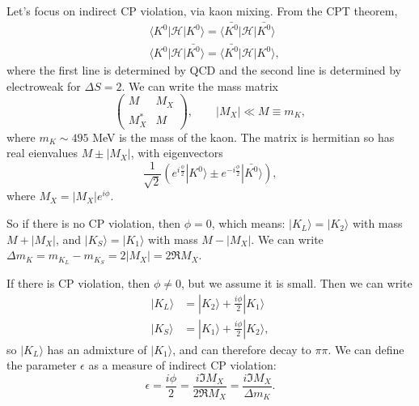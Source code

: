 Let's focus on indirect CP violation, via kaon mixing. From the CPT theorem,
\begin{equation}
\begin{split}
&\langle K^0 | \mathcal{H} | K^0 \rangle = \langle \bar{K^0} | \mathcal{H} | \bar{K^0} \rangle \\
&\langle K^0 | \mathcal{H} | \bar{K^0} \rangle = \langle \bar{K^0} | \mathcal{H} | K^0 \rangle,
\end{split}
\end{equation}
where the first line is determined by QCD and the second line is determined by electroweak for $\Delta S = 2$. We can write the mass matrix
\begin{equation}
\begin{pmatrix}
M & M_X \\
M_X^* & M 
\end{pmatrix},
\qquad |M_X| \ll M \equiv m_K,
\end{equation}
where $m_K \sim 495$ MeV is the mass of the kaon. The matrix is hermitian so has real eienvalues $M \pm |M_X|$, with eigenvectors
\begin{equation}
\frac{1}{\sqrt{2}} (e^{i\frac{\phi}{2}}|K^0\rangle \pm e^{-i\frac{\phi}{2}}|\bar{K^0}\rangle),
\end{equation}
where $M_X = |M_X|e^{i\phi}$. 

So if there is no CP violation, then $\phi=0$, which means: $|K_L\rangle = |K_2\rangle$ with mass $M+|M_X|$, and $|K_S\rangle = |K_1\rangle$ with mass $M-|M_X|$. We can write $\Delta m_K = m_{K_L} - m_{K_S} = 2|M_X| = 2 \Re M_X$.

If there is CP violation, then $\phi\neq 0$, but we assume it is small. Then we can write
\begin{equation}
\begin{split}
|K_L\rangle &= |K_2\rangle + \frac{i\phi}{2}|K_1\rangle \\
|K_S\rangle &= |K_1\rangle + \frac{i\phi}{2}|K_2\rangle,
\end{split}
\end{equation}
so $|K_L\rangle$ has an admixture of $|K_1\rangle$, and can therefore decay to $\pi\pi$. We can define the parameter $\epsilon$ as a measure of indirect CP violation:
\begin{equation}
\epsilon = \frac{i\phi}{2} = \frac{i\Im M_X}{2\Re M_X} = \frac{i\Im M_X}{\Delta m_K}.
\end{equation}
